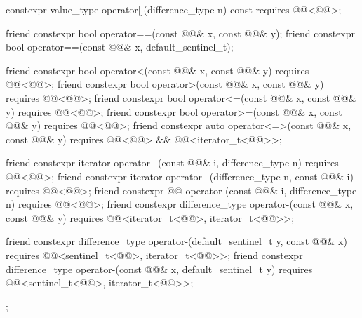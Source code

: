 \begin{codeblock}
{{    constexpr value_type operator[](difference_type n) const
      requires @@<@@>;

    friend constexpr bool operator==(const @@& x, const @@& y);
    friend constexpr bool operator==(const @@& x, default_sentinel_t);

    friend constexpr bool operator<(const @@& x, const @@& y)
      requires @@<@@>;
    friend constexpr bool operator>(const @@& x, const @@& y)
      requires @@<@@>;
    friend constexpr bool operator<=(const @@& x, const @@& y)
      requires @@<@@>;
    friend constexpr bool operator>=(const @@& x, const @@& y)
      requires @@<@@>;
    friend constexpr auto operator<=>(const @@& x, const @@& y)
      requires @@<@@> &&
               @@<iterator_t<@@>>;

    friend constexpr iterator operator+(const @@& i, difference_type n)
      requires @@<@@>;
    friend constexpr iterator operator+(difference_type n, const @@& i)
      requires @@<@@>;
    friend constexpr @@ operator-(const @@& i, difference_type n)
      requires @@<@@>;
    friend constexpr difference_type operator-(const @@& x, const @@& y)
      requires @@<iterator_t<@@>, iterator_t<@@>>;

    friend constexpr difference_type operator-(default_sentinel_t y, const @@& x)
      requires @@<sentinel_t<@@>, iterator_t<@@>>;
    friend constexpr difference_type operator-(const @@& x, default_sentinel_t y)
      requires @@<sentinel_t<@@>, iterator_t<@@>>;
  };
}
\end{codeblock}

